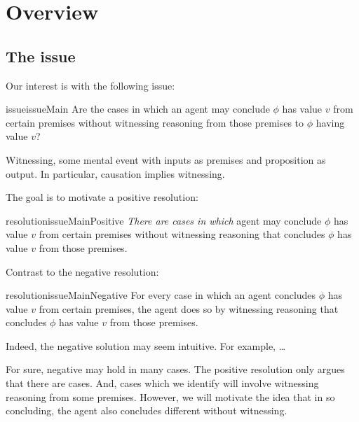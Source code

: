 \chapter{Overview}
\label{cha:overview}

\section{The issue}
\label{sec:issue}

\begin{note}
  Our interest is with the following issue:

  \begin{restatable}[Main]{issue}{issueMain}
    \label{issue:Main}
    Are the cases in which an agent may conclude \(\phi\) has value \(v\) from certain premises without witnessing reasoning from those premises to \(\phi\) having value \(v\)?
  \end{restatable}

  Witnessing, some mental event with inputs as premises and proposition as output.
  In particular, causation implies witnessing.

  The goal is to motivate a positive resolution:

  \begin{restatable}{resolution}{issueMainPositive}
    \label{issue:Main:R:p}
    \emph{There are cases in which} agent may conclude \(\phi\) has value \(v\) from certain premises without witnessing reasoning that concludes \(\phi\) has value \(v\) from those premises.
  \end{restatable}

  Contrast to the negative resolution:

  \begin{restatable}{resolution}{issueMainNegative}
    \label{issue:Main:R:p}
    For every case in which an agent concludes \(\phi\) has value \(v\) from certain premises, the agent does so by witnessing reasoning that concludes \(\phi\) has value \(v\) from those premises.
  \end{restatable}

  Indeed, the negative solution may seem intuitive.
  For example, \dots

  For sure, negative may hold in many cases.
  The positive resolution only argues that there are cases.
  And, cases which we identify will involve witnessing reasoning from some premises.
  However, we will motivate the idea that in so concluding, the agent also concludes different without witnessing.


\end{note}
